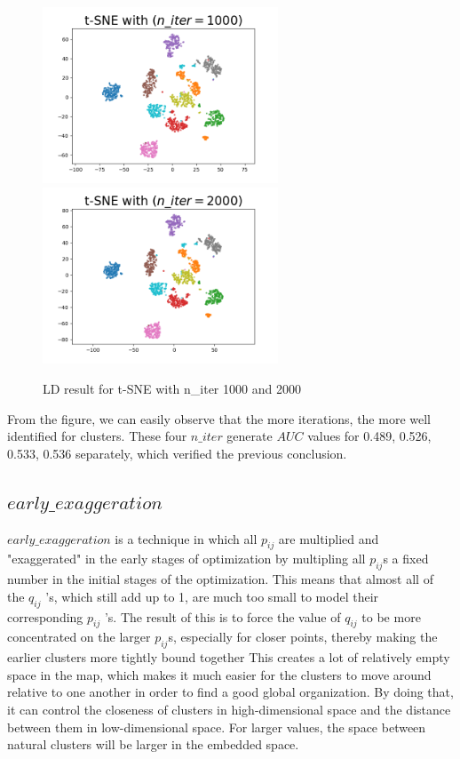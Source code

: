 \begin{figure}[H]
\centering  %
{
\label{Fig.sub.1}
\includegraphics[width=7cm,height=3.5cm\textwidth]{images/t-sne/tsne_niter_1000.png}}
{
\label{Fig.sub.2}
\includegraphics[width=7cm,height=3.5cm\textwidth]{images/t-sne/tsne_niter_2000.png}}
\caption{LD result for t-SNE with n\_iter 1000 and 2000}
\end{figure}

\noindent From the figure, we can easily observe that the more iterations, the more well identified for clusters. These four $n\_iter$ generate $AUC$ values for 0.489, 0.526, 0.533, 0.536 separately, which verified the previous conclusion.


\subsection{$early\_exaggeration$}

$ early\_exaggeration $ is a technique in which all $p_{ij}$ are multiplied and "exaggerated" in the early stages of optimization by multipling all $p_{ij}$s a fixed number in the initial stages of the optimization. This means that almost all of the $q_{ij}$ ’s, which still add up to 1, are much too small to model their corresponding $p_{ij}$ ’s. The result of this is to force the value of $q_ {ij}$ to be more concentrated on the larger $ p_{ij} $s, especially for closer points, thereby making the earlier clusters more tightly bound together This creates a lot of relatively empty space in the map, which makes it much easier for the clusters to move around relative to one another in order to find a good global organization\cite{ref13}. By doing that, it can control the closeness of clusters in high-dimensional space and the distance between them in low-dimensional space. For larger values, the space between natural clusters will be larger in the embedded space.



